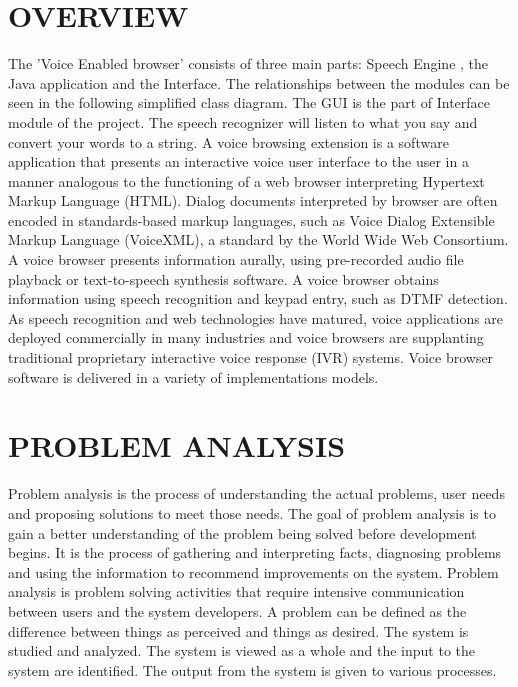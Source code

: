 \documentclass[12pt]{report} %
\begin{document}
\section{OVERVIEW}
\label{sec:OVERVIEW}
The 'Voice Enabled browser' consists of three main parts: Speech Engine , the Java application and the Interface. The relationships between the modules can be seen in the following simplified class diagram. The GUI is the part of Interface module of the project.  The speech recognizer will listen to what you say and convert your words to a string. A voice browsing extension is a software application that presents an interactive voice user interface to the user in a manner analogous to the functioning of a web browser interpreting Hypertext Markup Language (HTML). Dialog documents interpreted by browser are often encoded in standards-based markup languages, such as Voice Dialog Extensible Markup Language (VoiceXML), a standard by the World Wide Web Consortium. A voice browser presents information aurally, using pre-recorded audio file playback or text-to-speech synthesis software. A voice browser obtains information using speech recognition \cite{Ornbospeech,Walshspeech,speechStackoverflow} and keypad entry, such as DTMF detection. As speech recognition and web technologies have matured, voice applications are deployed commercially in many industries and voice browsers are supplanting traditional proprietary interactive voice response (IVR) systems. Voice browser software is delivered in a variety of implementations models.


\section{PROBLEM ANALYSIS}
\label{sec:PROBLEM ANALYSIS}

Problem analysis is the process of understanding the actual problems, user needs and proposing solutions to meet those needs. The goal of problem analysis is to gain a better understanding of the problem being solved before development begins. It is the process of gathering and interpreting facts, diagnosing problems and using the information to recommend improvements on the system. Problem analysis is problem solving activities that require intensive communication between users and the system developers. A problem can be defined as the difference between things as perceived and things as desired. The system is studied and analyzed. The system is viewed as a whole and the input to the system are identified. The output from the system is given to various processes.
\end{document}

